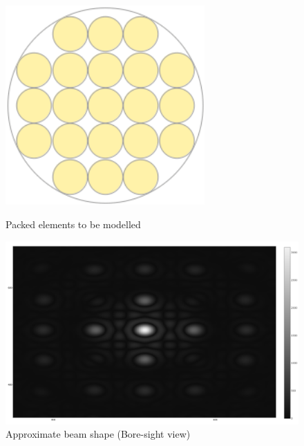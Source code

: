 \documentclass[final,32pt]{beamer}
\begin{document}
\begin{frame}[t]
\begin{multicols}{3}
\begin{figure}[h!]
    \begin{minipage}{0.49\columnwidth}
    \centering
    \includegraphics[width= 0.68\textwidth]{Figures/Design/arraySim/SquarePacking_r0.8_R4.5.png}
    \caption{Packed elements to be modelled}
    \label{fig:sqr_elem}
    \end{minipage}\hfill
    \begin{minipage}{0.49\columnwidth}
    \centering
    \includegraphics[width=1.1\textwidth]{Figures/Design/arraySim/2dbeamzoom.png}
    \caption{Approximate beam shape (Bore-sight view)}
    \label{fig:sqr_elem_topBeam}
    \end{minipage}
    
\end{figure}



\end{multicols}
\end{frame}
\end{document}
